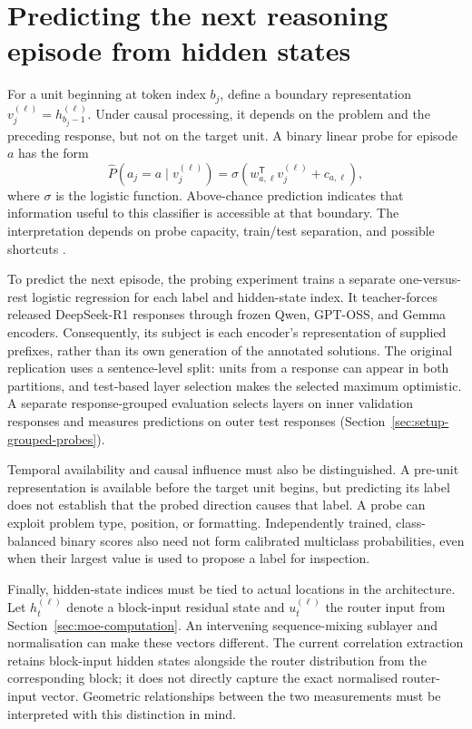 \documentclass[12pt,a4paper,twoside,openright]{book}
\begin{document}
\section{Predicting the next reasoning episode from hidden states}
\label{sec:next-episode-probes}

For a unit beginning at token index $b_j$, define a boundary representation
$v_j^{(\ell)}=h_{b_j-1}^{(\ell)}$. Under causal processing, it depends on the
problem and the preceding response, but not on the target unit. A binary
linear probe for episode $a$ has the form
\begin{equation}
  \widehat P(a_j=a\mid v_j^{(\ell)})
  = \sigma\left(w_{a,\ell}^{\mathsf T}v_j^{(\ell)}+c_{a,\ell}\right),
  \label{eq:linear-probe}
\end{equation}
where $\sigma$ is the logistic function. Above-chance prediction indicates
that information useful to this classifier is accessible at that boundary.
The interpretation depends on probe capacity, train/test separation, and
possible shortcuts \cite{hewitt2019control}.

To predict the next episode, the probing experiment trains a separate
one-versus-rest logistic regression for each label and hidden-state index.
It teacher-forces released DeepSeek-R1 responses through frozen Qwen, GPT-OSS,
and Gemma encoders.
Consequently, its subject is each encoder's representation of supplied
prefixes, rather than its own generation of the annotated solutions.
The original replication uses a sentence-level split: units from a response
can appear in both partitions, and test-based layer selection makes the
selected maximum optimistic. A separate response-grouped evaluation selects
layers on inner validation responses and measures predictions on outer test
responses (Section~\ref{sec:setup-grouped-probes}).

Temporal availability and causal influence must also be distinguished. A
pre-unit representation is available before the target unit begins, but
predicting its label does not establish that the probed direction causes that
label. A probe can exploit problem type, position, or formatting.
Independently trained, class-balanced
binary scores also need not form calibrated multiclass probabilities, even
when their largest value is used to propose a label for inspection.

Finally, hidden-state indices must be tied to actual locations in the
architecture. Let $h_t^{(\ell)}$ denote a block-input residual state and
$u_t^{(\ell)}$ the router input from Section~\ref{sec:moe-computation}.
An intervening sequence-mixing sublayer and normalisation can make these
vectors different. The current correlation extraction retains block-input
hidden states alongside the router distribution from the corresponding
block; it does not directly capture the exact normalised router-input vector.
Geometric relationships between the two measurements must be interpreted with
this distinction in mind.
\end{document}
